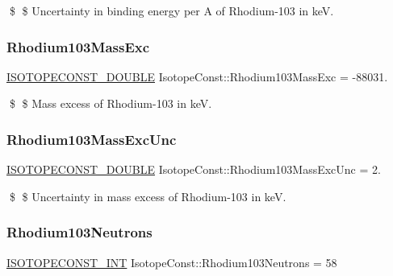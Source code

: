 \$ \$ Uncertainty in binding energy per A of Rhodium-\/103 in keV. \mbox{\label{group___isotope_const-_rhodium-_rh103_gac42865e48596fb8fc76a05a904feb3b8}} 
\subsubsection{\texorpdfstring{Rhodium103\+Mass\+Exc}{Rhodium103MassExc}}
{\footnotesize\ttfamily \mbox{\hyperlink{group___isotope_const-_macros_ga8f45a7272ce02c0b4c65c44636ed719a}{I\+S\+O\+T\+O\+P\+E\+C\+O\+N\+S\+T\+\_\+\+D\+O\+U\+B\+LE}} Isotope\+Const\+::\+Rhodium103\+Mass\+Exc = -\/88031.}

\$ \$ Mass excess of Rhodium-\/103 in keV. \mbox{\label{group___isotope_const-_rhodium-_rh103_ga3de72a2d188e952b6deb73af369297a9}} 
\subsubsection{\texorpdfstring{Rhodium103\+Mass\+Exc\+Unc}{Rhodium103MassExcUnc}}
{\footnotesize\ttfamily \mbox{\hyperlink{group___isotope_const-_macros_ga8f45a7272ce02c0b4c65c44636ed719a}{I\+S\+O\+T\+O\+P\+E\+C\+O\+N\+S\+T\+\_\+\+D\+O\+U\+B\+LE}} Isotope\+Const\+::\+Rhodium103\+Mass\+Exc\+Unc = 2.}

\$ \$ Uncertainty in mass excess of Rhodium-\/103 in keV. \mbox{\label{group___isotope_const-_rhodium-_rh103_gadc5080efec95f0ca6a1966cee0953463}} 
\subsubsection{\texorpdfstring{Rhodium103\+Neutrons}{Rhodium103Neutrons}}
{\footnotesize\ttfamily \mbox{\hyperlink{group___isotope_const-_macros_ga5f18360b3e99483a35c32d789e62621c}{I\+S\+O\+T\+O\+P\+E\+C\+O\+N\+S\+T\+\_\+\+I\+NT}} Isotope\+Const\+::\+Rhodium103\+Neutrons = 58}

